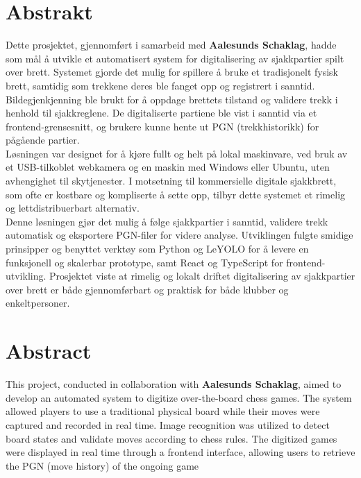 \chapter*{Abstrakt}

Dette prosjektet, gjennomført i samarbeid med \textbf{Aalesunds Schaklag}, hadde som mål å utvikle et automatisert system for digitalisering av sjakkpartier spilt over brett. Systemet gjorde det mulig for spillere å bruke et tradisjonelt fysisk brett, samtidig som trekkene deres ble fanget opp og registrert i sanntid. Bildegjenkjenning ble brukt for å oppdage brettets tilstand og validere trekk i henhold til sjakkreglene. De digitaliserte partiene ble vist i sanntid via et frontend-grensesnitt, og brukere kunne hente ut PGN (trekkhistorikk) for pågående partier. \\

Løsningen var designet for å kjøre fullt og helt på lokal maskinvare, ved bruk av et USB-tilkoblet webkamera og en maskin med Windows eller Ubuntu, uten avhengighet til skytjenester. I motsetning til kommersielle digitale sjakkbrett, som ofte er kostbare og kompliserte å sette opp, tilbyr dette systemet et rimelig og lettdistribuerbart alternativ. \\

Denne løsningen gjør det mulig å følge sjakkpartier i sanntid, validere trekk automatisk og eksportere PGN-filer for videre analyse. Utviklingen fulgte smidige prinsipper og benyttet verktøy som Python og LeYOLO for å levere en funksjonell og skalerbar prototype, samt React og TypeScript for frontend-utvikling. Prosjektet viste at rimelig og lokalt driftet digitalisering av sjakkpartier over brett er både gjennomførbart og praktisk for både klubber og enkeltpersoner.

\newpage

\chapter*{Abstract}
This project, conducted in collaboration with \textbf{Aalesunds Schaklag}, aimed to develop an automated system to digitize over-the-board chess games. The system allowed players to use a traditional physical board while their moves were captured and recorded in real time. Image recognition was utilized to detect board states and validate moves according to chess rules. The digitized games were displayed in real time through a frontend interface, allowing users to retrieve the PGN (move history) of the ongoing game \\

